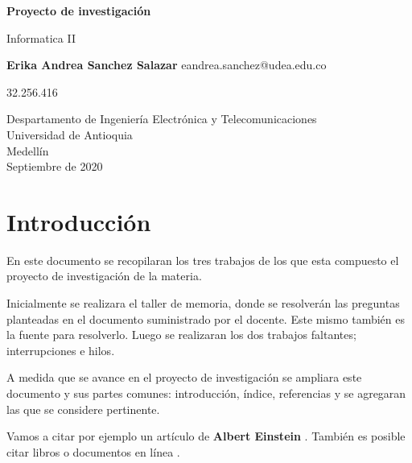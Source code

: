 \documentclass{article}
\begin{document}
\begin{titlepage}
    \begin{center}
        \vspace*{1cm}
            
        \Huge
        \textbf{Proyecto de investigación}
            
        \vspace{0.5cm}
        \LARGE
        Informatica II
            
        \vspace{1.5cm}
            
        \textbf{Erika Andrea Sanchez Salazar}
        \LARGE
         eandrea.sanchez@udea.edu.co
         
        32.256.416
        
       
            
        \vfill
            
        \vspace{0.8cm}
            
        \Large
        Despartamento de Ingeniería Electrónica y Telecomunicaciones\\
        Universidad de Antioquia\\
        Medellín\\
        Septiembre de 2020
            
    \end{center}
\end{titlepage}

\tableofcontents
\newpage
\section{Introducción}\label{intro}
En este documento se recopilaran los tres trabajos de los que esta compuesto el proyecto de investigación de la materia. 

Inicialmente se realizara el taller de memoria, donde se resolverán las preguntas planteadas en el documento suministrado por el docente. Este mismo también es la fuente para resolverlo. Luego se realizaran los dos trabajos faltantes; interrupciones e hilos.

A medida que se avance en el proyecto de investigación se ampliara este documento y sus partes comunes: introducción, índice, referencias y se agregaran las que se considere pertinente.

\newpage
Vamos a citar por ejemplo un artículo de \textbf{Albert Einstein} \cite{einstein}.
También es posible citar libros \cite{dirac} o documentos en línea \cite{knuthwebsite}.
\end{document}
